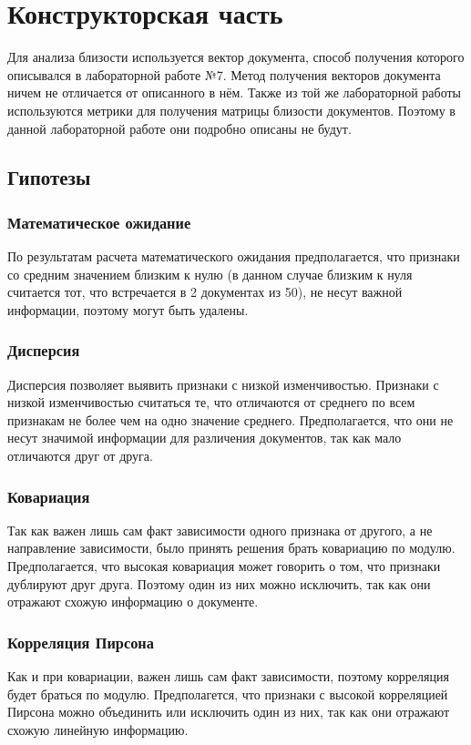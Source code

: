 \chapter{Конструкторская часть}

Для анализа близости используется вектор документа, способ получения которого описывался в лабораторной работе №7. 
Метод получения векторов документа ничем не отличается от описанного в нём.
Также из той же лабораторной работы используются метрики для получения матрицы близости документов.
Поэтому в данной лабораторной работе они подробно описаны не будут.

\section{Гипотезы}

\subsection{Математическое ожидание}
По результатам расчета математического ожидания предполагается, что признаки со средним значением близким к нулю (в данном случае близким к нуля считается тот, что встречается в 2 документах из 50),
не несут важной информации, поэтому могут быть удалены.

\subsection{Дисперсия}
Дисперсия позволяет выявить признаки с низкой изменчивостью. 
Признаки с низкой изменчивостью считаться те, что отличаются от среднего по всем признакам не более чем на одно значение среднего. 
Предполагается, что они не несут значимой информации для различения документов, так как мало отличаются друг от друга.

\subsection{Ковариация}
Так как важен лишь сам факт зависимости одного признака от другого, а не направление зависимости, было принять решения брать ковариацию по модулю.
Предполагается, что высокая ковариация может говорить о том, что признаки дублируют друг друга. Поэтому один из них можно исключить, так как они отражают схожую информацию о документе.

\subsection{Корреляция Пирсона}
Как и при ковариации, важен лишь сам факт зависимости, поэтому корреляция будет браться по модулю. 
Предполагется, что признаки с высокой корреляцией Пирсона можно объединить или исключить один из них, так как они отражают схожую линейную информацию.

